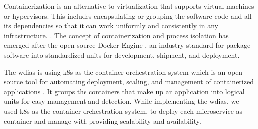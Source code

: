 


Containerization is an alternative to virtualization that supports virtual machines or hypervisors. This includes encapsulating or grouping the software code and all its dependencies so that it can work uniformly and consistently in any infrastructure. \cite{IBMContainerizationExplained}. The concept of containerization and process isolation has emerged after the open-source Docker Engine \cite{DockerAppContainerization}, an industry standard for package software into standardized units for development, shipment, and deployment.

The \acrshort{wdias} is using \acrfull{k8s} as the container orchestration system which is an open-source tool for automating deployment, scaling, and management of containerized applications \cite{LinuxFoundationProduction-GradeKubernetes}. It groups the containers that make up an application into logical units for easy management and detection. While implementing the \acrshort{wdias}, we used \acrshort{k8s} as the container-orchestration system, to deploy each microservice as container and manage with providing scalability and availability.

